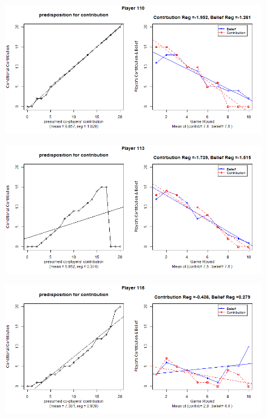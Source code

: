 

\begin{figure}[!h]
	\includegraphics[scale=0.5]{images/appendixB/P110.png}
\end{figure}

\begin{figure}[!h]
	\includegraphics[scale=0.5]{images/appendixB/P113.png}
\end{figure}

\begin{figure}[!h]
	\includegraphics[scale=0.5]{images/appendixB/P115.png}
\end{figure}


